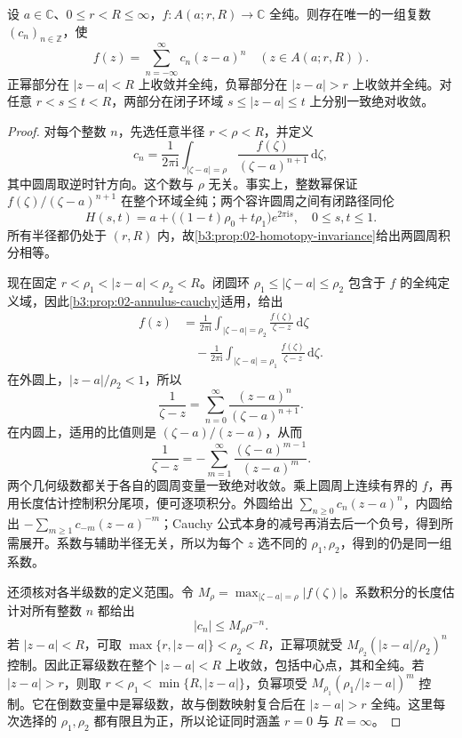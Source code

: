 \begin{theorem}[Laurent]\label{b3:thm:03-laurent}
设 \(a\in\mathbb C\)、\(0\le r<R\le\infty\)，\(f:A(a;r,R)\to\mathbb C\) 全纯。则存在唯一的一组复数 \((c_n)_{n\in\mathbb Z}\)，使
\[
 f(z)=\sum_{n=-\infty}^{\infty}c_n(z-a)^n
 \quad(z\in A(a;r,R)).
\]
正幂部分在 \(|z-a|<R\) 上收敛并全纯，负幂部分在 \(|z-a|>r\) 上收敛并全纯。对任意 \(r<s\le t<R\)，两部分在闭子环域 \(s\le|z-a|\le t\) 上分别一致绝对收敛。
\end{theorem}
\begin{proof}
对每个整数 \(n\)，先选任意半径 \(r<\rho<R\)，并定义
\[
 c_n=\frac1{2\pi\mathrm{i}}\int_{|\zeta-a|=\rho}
 \frac{f(\zeta)}{(\zeta-a)^{n+1}}\,\mathrm{d}\zeta,
\]
其中圆周取逆时针方向。这个数与 \(\rho\) 无关。事实上，整数幂保证 \(f(\zeta)/(\zeta-a)^{n+1}\) 在整个环域全纯；两个容许圆周之间有闭路径同伦
\[
 H(s,t)=a+\bigl((1-t)\rho_0+t\rho_1\bigr)e^{2\pi\mathrm{i}s},
 \quad 0\le s,t\le1.
\]
所有半径都仍处于 \((r,R)\) 内，故\cref{b3:prop:02-homotopy-invariance}给出两圆周积分相等。

现在固定 \(r<\rho_1<|z-a|<\rho_2<R\)。闭圆环 \(\rho_1\le|\zeta-a|\le\rho_2\) 包含于 \(f\) 的全纯定义域，因此\cref{b3:prop:02-annulus-cauchy}适用，给出
\[
 \begin{aligned}
 f(z)&=\frac1{2\pi\mathrm{i}}\int_{|\zeta-a|=\rho_2}
       \frac{f(\zeta)}{\zeta-z}\,\mathrm{d}\zeta\\
 &\quad-\frac1{2\pi\mathrm{i}}\int_{|\zeta-a|=\rho_1}
       \frac{f(\zeta)}{\zeta-z}\,\mathrm{d}\zeta.
 \end{aligned}
\]
在外圆上，\(|z-a|/\rho_2<1\)，所以
\[
 \frac1{\zeta-z}
 =\sum_{n=0}^{\infty}\frac{(z-a)^n}{(\zeta-a)^{n+1}}.
\]
在内圆上，适用的比值则是 \((\zeta-a)/(z-a)\)，从而
\[
 \frac1{\zeta-z}
 =-\sum_{m=1}^{\infty}\frac{(\zeta-a)^{m-1}}{(z-a)^m}.
\]
两个几何级数都关于各自的圆周变量一致绝对收敛。乘上圆周上连续有界的 \(f\)，再用长度估计控制积分尾项，便可逐项积分。外圆给出 \(\sum_{n\ge0}c_n(z-a)^n\)，内圆给出 \(-\sum_{m\ge1}c_{-m}(z-a)^{-m}\)；Cauchy 公式本身的减号再消去后一个负号，得到所需展开。系数与辅助半径无关，所以为每个 \(z\) 选不同的 \(\rho_1,\rho_2\)，得到的仍是同一组系数。

还须核对各半级数的定义范围。令 \(M_\rho=\max_{|\zeta-a|=\rho}|f(\zeta)|\)。系数积分的长度估计对所有整数 \(n\) 都给出
\[
 |c_n|\le M_\rho\rho^{-n}.
\]
若 \(|z-a|<R\)，可取 \(\max\{r,|z-a|\}<\rho_2<R\)，正幂项就受 \(M_{\rho_2}(|z-a|/\rho_2)^n\) 控制。因此正幂级数在整个 \(|z-a|<R\) 上收敛，包括中心点，其和全纯。若 \(|z-a|>r\)，则取 \(r<\rho_1<\min\{R,|z-a|\}\)，负幂项受 \(M_{\rho_1}(\rho_1/|z-a|)^m\) 控制。它在倒数变量中是幂级数，故与倒数映射复合后在 \(|z-a|>r\) 全纯。这里每次选择的 \(\rho_1,\rho_2\) 都有限且为正，所以论证同时涵盖 \(r=0\) 与 \(R=\infty\)。


\end{proof}
